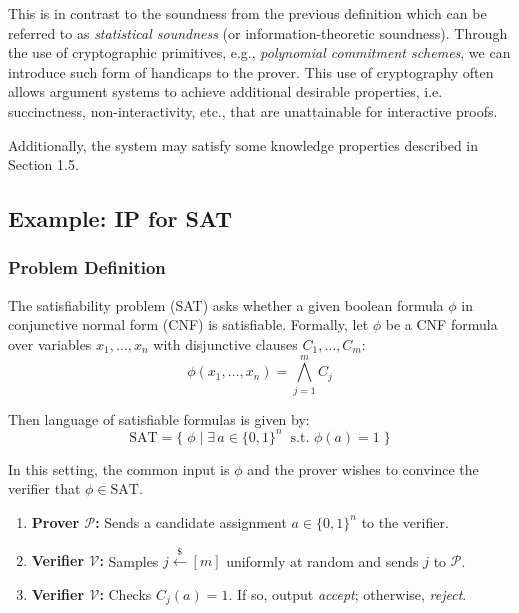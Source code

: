 \noindent This is in contrast to the soundness from the previous definition which can be referred to as \emph{statistical soundness} (or information-theoretic soundness). Through the use of cryptographic primitives, e.g., \emph{polynomial commitment schemes}, we can introduce such form of handicaps to the prover. This use of cryptography often allows argument systems to achieve additional desirable  properties, i.e. succinctness, non-interactivity, etc., that are unattainable for interactive proofs. \\

\begin{remark}
Additionally, the system may satisfy some knowledge properties described in Section 1.5.
\end{remark}

\myspace

\subsection*{Example: IP for SAT}

\subsubsection*{Problem Definition}

The satisfiability problem (SAT) asks whether a given boolean formula $\phi$ in conjunctive normal form (CNF) is satisfiable. Formally, let $\phi$ be a CNF formula over variables $x_1, \dots, x_n$ with disjunctive clauses $C_1, \dots, C_m$:
$$
\phi(x_1,\dots,x_n) = \bigwedge_{j=1}^m C_j
$$

\noindent Then language of satisfiable formulas is given by:
\[
\text{SAT} = \{\;\phi \mid \exists \, a \in \{0,1\}^n \;\; \text{s.t. } \phi(a)=1 \;\}
\]

\noindent In this setting, the common input is $\phi$ and the prover wishes to convince the verifier that $\phi \in \text{SAT}$.

\myspace

\begin{protocol}
\begin{enumerate}
  \item \textbf{Prover $\mathcal{P}$:} Sends a candidate assignment $a\in\{0,1\}^n$ to the verifier.
  \item \textbf{Verifier $\mathcal{V}$:} Samples $j \xleftarrow{\$} [m]$ uniformly at random and sends $j$ to $\mathcal{P}$.
  \item \textbf{Verifier $\mathcal{V}$:} Checks $C_j(a)=1$. If so, output \emph{accept}; otherwise, \emph{reject}.
\end{enumerate}
\end{protocol}

